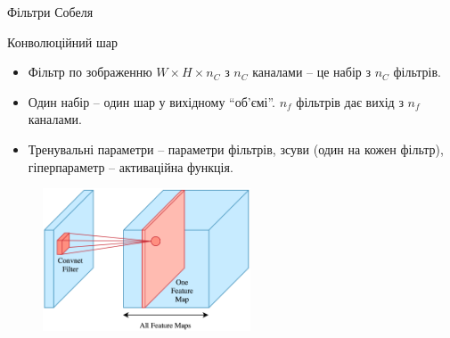 \documentclass[xcolor={usenames,dvipsnames}]{beamer}
\begin{document}
\begin{frame}[fragile]{Фільтри Собеля}
    \end{frame}
    
    \begin{frame}{Конволюційний шар}
        \begin{itemize}
            \item Фільтр по зображенню $W \times H \times n_C$ з $n_C$ каналами -- це набір з $n_C$ фільтрів.
            \item Один набір -- один шар у вихідному ``об'ємі''. $n_f$ фільтрів дає вихід з $n_f$ каналами.
            \item Тренувальні параметри -- параметри фільтрів, зсуви (один на кожен фільтр), гіперпараметр -- активаційна функція.
        \end{itemize}        

        \begin{figure}
        \centering
            \includegraphics[width=0.55\textwidth]{images/cnn_volume.png}
        \end{figure}
    \end{frame}
	
\end{document}
